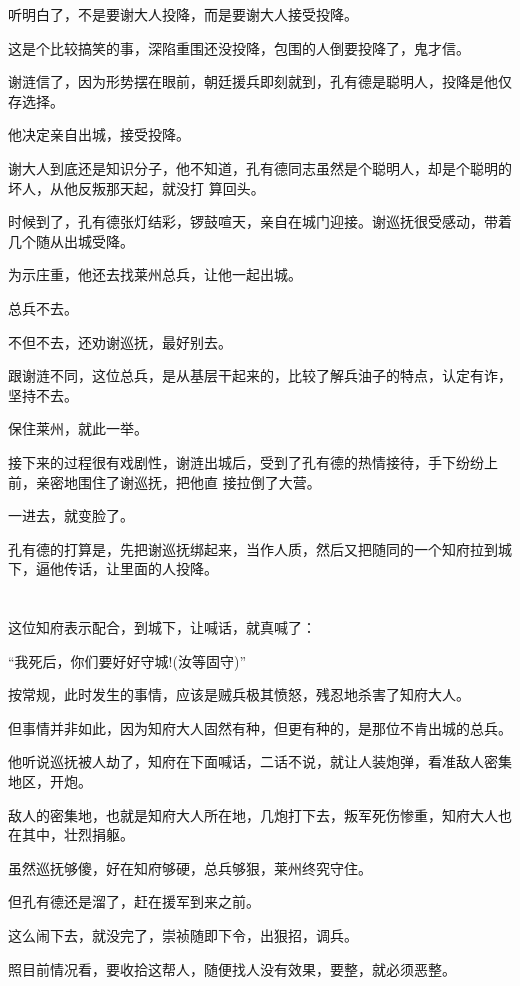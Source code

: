 \documentclass[11pt,a4paper,onecolumn]{article}
\begin{document}
听明白了，不是要谢大人投降，而是要谢大人接受投降。

这是个比较搞笑的事，深陷重围还没投降，包围的人倒要投降了，鬼才信。

谢涟信了，因为形势摆在眼前，朝廷援兵即刻就到，孔有德是聪明人，投降是他仅存选择。

他决定亲自出城，接受投降。

谢大人到底还是知识分子，他不知道，孔有德同志虽然是个聪明人，却是个聪明的坏人，从他反叛那天起，就没打
算回头。

时候到了，孔有德张灯结彩，锣鼓喧天，亲自在城门迎接。谢巡抚很受感动，带着几个随从出城受降。

为示庄重，他还去找莱州总兵，让他一起出城。

总兵不去。

不但不去，还劝谢巡抚，最好别去。

跟谢涟不同，这位总兵，是从基层干起来的，比较了解兵油子的特点，认定有诈，坚持不去。

保住莱州，就此一举。

接下来的过程很有戏剧性，谢涟出城后，受到了孔有德的热情接待，手下纷纷上前，亲密地围住了谢巡抚，把他直
接拉倒了大营。

一进去，就变脸了。

孔有德的打算是，先把谢巡抚绑起来，当作人质，然后又把随同的一个知府拉到城下，逼他传话，让里面的人投降。

\section[\thesection]{}

这位知府表示配合，到城下，让喊话，就真喊了：

``我死后，你们要好好守城!(汝等固守)''

按常规，此时发生的事情，应该是贼兵极其愤怒，残忍地杀害了知府大人。

但事情并非如此，因为知府大人固然有种，但更有种的，是那位不肯出城的总兵。

他听说巡抚被人劫了，知府在下面喊话，二话不说，就让人装炮弹，看准敌人密集地区，开炮。

敌人的密集地，也就是知府大人所在地，几炮打下去，叛军死伤惨重，知府大人也在其中，壮烈捐躯。

虽然巡抚够傻，好在知府够硬，总兵够狠，莱州终究守住。

但孔有德还是溜了，赶在援军到来之前。

这么闹下去，就没完了，崇祯随即下令，出狠招，调兵。

照目前情况看，要收拾这帮人，随便找人没有效果，要整，就必须恶整。
\end{document}
